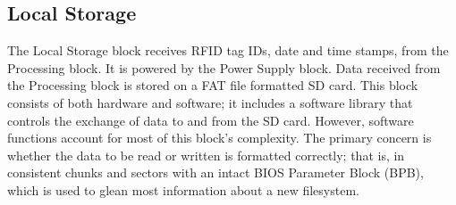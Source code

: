 

\subsection{Local Storage}
The Local Storage block receives RFID tag IDs, date and time stamps, from the Processing block. It is powered by the Power Supply block. Data received from the Processing block is stored on a FAT file formatted SD card. This block consists of both hardware and software; it includes a software library that controls the exchange of data to and from the SD card. However, software functions account for most of this block's complexity. The primary concern is whether the data to be read or written is formatted correctly; that is, in consistent chunks and sectors with an intact BIOS Parameter Block (BPB), which is used to glean most information about a new filesystem.


% 
